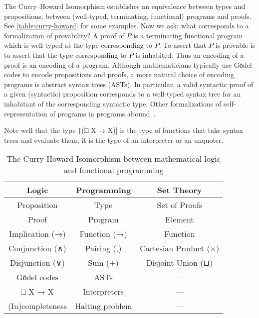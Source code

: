  The Curry--Howard Isomorphism establishes an equivalence between
 types and propositions, between (well-typed, terminating, functional)
 programs and proofs.  See \autoref{table:curry-howard} for some
 examples.  Now we ask: what corresponds to a formalization of
 provability?  A proof of $P$ is a terminating functional program
 which is well-typed at the type corresponding to $P$.  To assert that
 $P$ is provable is to assert that the type corresponding to $P$ is
 inhabited.  Thus an encoding of a proof is an encoding of a program.
 Although mathematicians typically use Gӧdel codes to encode
 propositions and proofs, a more natural choice of encoding programs
 is abstract syntax trees (ASTs).  In particular, a valid syntactic
 proof of a given (syntactic) proposition corresponds to a well-typed
 syntax tree for an inhabitant of the corresponding syntactic type.
 Other formalizations of self-representation of programs in programs
 abound~\cite{church1940formulation,Davies:2001:MAS:382780.382785,geuvers2014church,Kiselyov2012,DBLP:conf/ershov/Mogensen01,PFENNING1991137,scott1963system,nott31169,Berarducci1985,brown2016breaking}.

 Note well that the type \texttt|(□ X → X)| is the type of
 functions that take syntax trees and evaluate them; it is the type
 of an interpreter or an unquoter.

  \begin{table}
  \begin{center}
  \begin{tabular}{ccc}
  Logic & Programming & Set Theory \\ \hline
  Proposition & Type & Set of Proofs \\
  Proof & Program & Element \\
  Implication (→) & Function (→) & Function  \\
  Conjunction (∧) & Pairing (,) & Cartesian Product (×)  \\
  Disjunction (∨) & Sum (+) & Disjoint Union (⊔) \\
  Gӧdel codes & ASTs & --- \\
  □ X → X & Interpreters & --- \\
  (In)completeness & Halting problem & ---
  \end{tabular}
  \end{center}
  \caption{The Curry-Howard Isomorphism between mathematical logic and functional programming} \label{table:curry-howard}
  \end{table}

